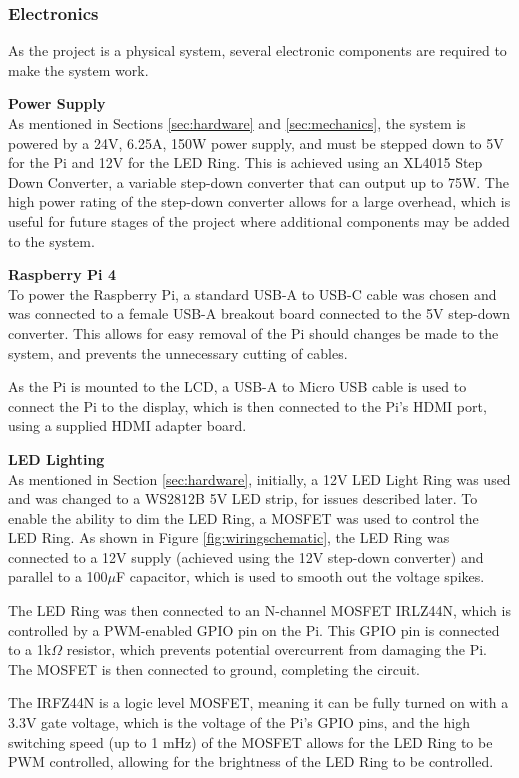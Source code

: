 \subsubsection{Electronics}
As the project is a physical system, several electronic components are required to make the system work.

\noindent
\textbf{Power Supply} \\
As mentioned in Sections \ref*{sec:hardware} and \ref*{sec:mechanics}, the system is powered by a 24V, 6.25A, 150W power supply, and must
be stepped down to 5V for the Pi and 12V for the LED Ring. This is achieved using an XL4015 Step Down Converter\cite{xl4015}, a variable
step-down converter that can output up to 75W.
The high power rating of the step-down converter allows for a large overhead, which is useful for future stages of the project where 
additional components may be added to the system.

\noindent
\textbf{Raspberry Pi 4} \\
To power the Raspberry Pi, a standard USB-A to USB-C cable was chosen and was connected to a female USB-A breakout board connected to the
5V step-down converter. This allows for easy removal of the Pi should changes be made to the system, and prevents the unnecessary
cutting of cables.

As the Pi is mounted to the LCD, a USB-A to Micro USB cable is used to connect the Pi to the display, which is then connected to the
Pi's HDMI port, using a supplied HDMI adapter board.

\noindent
\textbf{LED Lighting} \\
As mentioned in Section \ref*{sec:hardware}, initially, a 12V LED Light Ring was used and was changed to a WS2812B 5V LED strip, for issues described 
later. To enable the ability to dim the LED Ring, a MOSFET was used to control the LED Ring. As shown in Figure \ref*{fig:wiringschematic}, the LED Ring was connected to a 12V supply (achieved using the 12V step-down converter) and
parallel to a 100$\mu$F capacitor, which is used to smooth out the voltage spikes.

The LED Ring was then connected to an N-channel MOSFET IRLZ44N\cite{irlz44n}, which is controlled by a PWM-enabled GPIO pin on the Pi.
This GPIO pin is connected to a 1k$\Omega$ resistor, which prevents potential overcurrent from damaging the Pi. The MOSFET is then connected to ground, completing the circuit.

The IRFZ44N is a logic level MOSFET, meaning it can be fully turned on with a 3.3V gate voltage, which is the voltage of the Pi's GPIO pins, and the high
switching speed (up to 1 mHz) of the MOSFET allows for the LED Ring to be PWM controlled, allowing for the brightness of the LED Ring to be controlled.